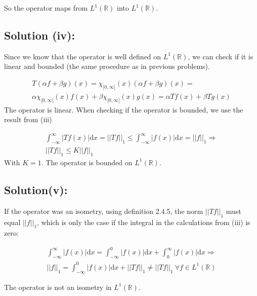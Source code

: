 \documentclass{article}
\begin{document}
So the operator maps from $L^1(\mathbb{R})$ into $L^1(\mathbb{R})$.

\subsection*{Solution (iv):}
Since we know that the operator is well defined on $L^1(\mathbb{R})$, we can check if it is linear and bounded (the same procedure as in previous problems).

\begin{gather*}
    T(\alpha f + \beta g)(x) = \chi_{[0,\infty[}(x)(\alpha f + \beta g)(x) =\\
    \alpha\chi_{[0,\infty[}(x) f (x)+ \beta \chi_{[0,\infty[}(x) g(x) = \alpha Tf(x) + \beta Tg(x)
\end{gather*}
The operator is linear. When checking if the operator is bounded, we use the result from (iii)

\begin{gather*}
    \int_{-\infty}^{\infty} |Tf(x)| \text{d}x = ||Tf||_1 \leq \int_{-\infty}^{\infty} |f(x)| \text{d}x = ||f||_1 \Rightarrow \\
    ||Tf||_1 \leq K||f||_1
\end{gather*}
With $K=1$. The operator is bounded on $L^1(\mathbb{R})$.  

\subsection*{Solution(v):}
If the operator was an isometry, using definition 2.4.5, the norm $||Tf||_1$ must equal $||f||_1$, which is only the case if the integral in the calculations from (iii) is zero:

\begin{gather*}
    \int_{-\infty}^{\infty} |f(x)| \text{d}x = \int_{-\infty}^{0} |f(x)| \text{d}x + \int_{0}^{\infty} |f(x)| \text{d}x \Rightarrow \\
    ||f||_1 = \int_{-\infty}^{0} |f(x)| \text{d}x + ||Tf||_1 \neq ||Tf||_1 \: \forall f \in L^1(\mathbb{R})
\end{gather*}

The operator is not an isometry in $L^1(\mathbb{R})$.
\end{document}
